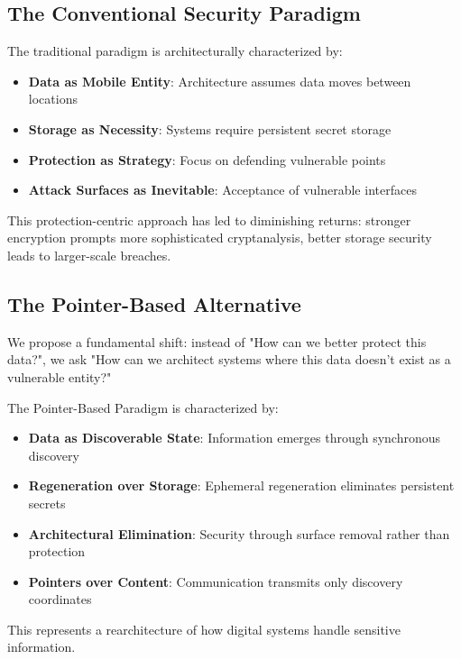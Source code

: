 \documentclass[11pt,a4paper]{article}
\begin{document}
\subsection{The Conventional Security Paradigm}

The traditional paradigm is architecturally characterized by:

\begin{itemize}
    \item \textbf{Data as Mobile Entity}: Architecture assumes data moves between locations
    \item \textbf{Storage as Necessity}: Systems require persistent secret storage
    \item \textbf{Protection as Strategy}: Focus on defending vulnerable points
    \item \textbf{Attack Surfaces as Inevitable}: Acceptance of vulnerable interfaces
\end{itemize}

This protection-centric approach has led to diminishing returns: stronger encryption prompts more sophisticated cryptanalysis, better storage security leads to larger-scale breaches.

\subsection{The Pointer-Based Alternative}

We propose a fundamental shift: instead of "How can we better protect this data?", we ask "How can we architect systems where this data doesn't exist as a vulnerable entity?"

The Pointer-Based Paradigm is characterized by:

\begin{itemize}
    \item \textbf{Data as Discoverable State}: Information emerges through synchronous discovery
    \item \textbf{Regeneration over Storage}: Ephemeral regeneration eliminates persistent secrets
    \item \textbf{Architectural Elimination}: Security through surface removal rather than protection
    \item \textbf{Pointers over Content}: Communication transmits only discovery coordinates
\end{itemize}

This represents a rearchitecture of how digital systems handle sensitive information.
\end{document}
